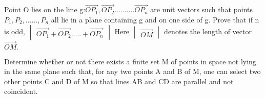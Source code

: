 \item Point O lies on the line g:$\overrightarrow{OP_1}, \overrightarrow{OP_2}..........\overrightarrow{OP_n}$ are unit vectors such that points
$P_1, P_2,......, P_n$ all lie in a plane containing g and on one side of g. Prove that
if n is odd,
$\begin{vmatrix}
\overrightarrow{OP_1} + \overrightarrow{OP_2}.....+\overrightarrow{OP_n} 
\end{vmatrix}$
Here 
$\begin{vmatrix} 
\overrightarrow{OM}
\end{vmatrix}$
denotes the length of vector $\overrightarrow{OM}.$
\item Determine whether or not there exists a finite set M of points in space not lying in the same plane such that, for any two points A and B of M, one can select two other points C and D of M so that lines AB and CD are parallel and not coincident.


